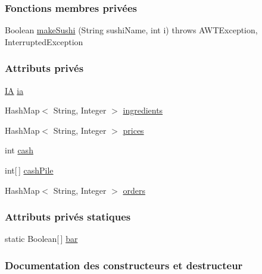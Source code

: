 \subsubsection*{Fonctions membres privées}
\begin{DoxyCompactItemize}
\item 
Boolean \hyperlink{classManager_a2367553c5fc1fc67dceb06e0dad0e5b0}{make\+Sushi} (String sushi\+Name, int i)  throws A\+W\+T\+Exception, 			\+Interrupted\+Exception 
\end{DoxyCompactItemize}
\subsubsection*{Attributs privés}
\begin{DoxyCompactItemize}
\item 
\hyperlink{classIA}{I\+A} \hyperlink{classManager_a90957746b755371f0051a74b81f2827f}{ia}
\item 
Hash\+Map$<$ String, Integer $>$ \hyperlink{classManager_a731ab4f92babdcabb9a0e2e8ecc91b27}{ingredients}
\item 
Hash\+Map$<$ String, Integer $>$ \hyperlink{classManager_a4cb6296ce84b2fa63ff5726db1584238}{prices}
\item 
int \hyperlink{classManager_a50ed4ee3a6f3c444fab29330ba967ba4}{cash}
\item 
int\mbox{[}$\,$\mbox{]} \hyperlink{classManager_a7b0b5ed401cace73cb58b2510efc2508}{cash\+Pile}
\item 
Hash\+Map$<$ String, Integer $>$ \hyperlink{classManager_ab01a8b5bc2e4f1cc3abc9247bbf2ae6b}{orders}
\end{DoxyCompactItemize}
\subsubsection*{Attributs privés statiques}
\begin{DoxyCompactItemize}
\item 
static Boolean\mbox{[}$\,$\mbox{]} \hyperlink{classManager_a368d64d6025fecd75245c954cfa72e6a}{bar}
\end{DoxyCompactItemize}


\subsubsection{Documentation des constructeurs et destructeur}
\hypertarget{classManager_ac6127238598371b4f44d1eed3b0c3b51}{}
